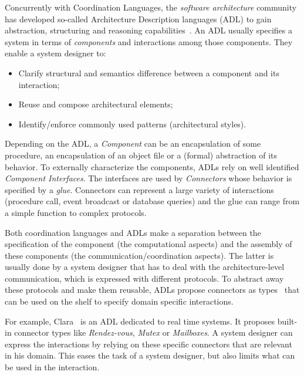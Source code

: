Concurrently with Coordination Languages, the \emph{software architecture} community has developed so-called Architecture Description languages (ADL) to gain abstraction, structuring and reasoning capabilities~\cite{rapidebib,wrightbib,uniconbib,frameadlsbib,garlansoftarchbib}. An ADL usually specifies a system in terms of \emph{components} and interactions among those components. They enable a system designer to:
\begin{itemize}
	\item Clarify structural and semantics difference between a component and its interaction;
	\item Reuse and compose architectural elements;
	\item Identify/enforce commonly used patterns (\eg architectural styles).
\end{itemize}

Depending on the ADL, a \emph{Component} can be an encapsulation of some procedure, an encapsulation of an object file or a (formal) abstraction of its behavior. To externally characterize the components, ADLs rely on well identified \emph{Component Interfaces}. The interfaces are used by \emph{Connectors} whose behavior is specified by a \emph{glue}. Connectors can represent a large variety of interactions (\eg procedure call, event broadcast or database queries) and the glue can range from a simple function to complex protocols. 

Both coordination languages and ADLs make a separation between the specification of the component (\ie the computational aspects) and the assembly of these components (\ie the communication/coordination aspects). The latter is usually done by a system designer that has to deal with the architecture-level communication, which is expressed with different protocols. To abstract away these protocols and make them reusable, ADLs propose connectors as types~\cite{frameadlsbib} that can be used on the shelf to specify domain specific interactions.

For example, Clara~\cite{clarabib} is an ADL dedicated to real time systems. It proposes built-in connector types like \emph{Rendez-vous}, \emph{Mutex} or \emph{Mailboxes}. A system designer can express the interactions by relying on these specific connectors that are relevant in his domain. This eases the task of a system designer, but also limits what can be used in the interaction. 

